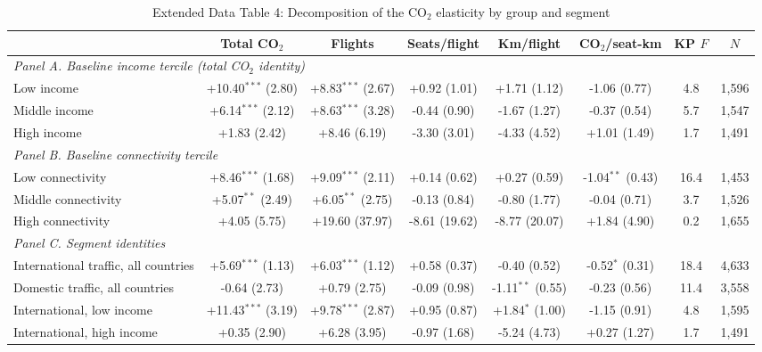 \documentclass[12pt]{article}
\begin{document}
\begin{table}[htbp]
\centering
\begin{threeparttable}
\caption{Extended Data Table 4: Decomposition of the CO$_2$ elasticity by group and segment}
\label{tab:decomp_hetero}
\scriptsize
\begin{tabular}{lccccccc}
\toprule
 & Total CO$_2$ & Flights & Seats/flight & Km/flight & CO$_2$/seat-km & KP $F$ & $N$ \\
\midrule
\multicolumn{8}{l}{\textit{Panel A. Baseline income tercile (total CO$_2$ identity)}} \\
  Low income & +10.40$^{***}$ (2.80) & +8.83$^{***}$ (2.67) & +0.92 (1.01) & +1.71 (1.12) & -1.06 (0.77) & 4.8 & 1,596 \\
  Middle income & +6.14$^{***}$ (2.12) & +8.63$^{***}$ (3.28) & -0.44 (0.90) & -1.67 (1.27) & -0.37 (0.54) & 5.7 & 1,547 \\
  High income & +1.83 (2.42) & +8.46 (6.19) & -3.30 (3.01) & -4.33 (4.52) & +1.01 (1.49) & 1.7 & 1,491 \\
\multicolumn{8}{l}{\textit{Panel B. Baseline connectivity tercile}} \\
  Low connectivity & +8.46$^{***}$ (1.68) & +9.09$^{***}$ (2.11) & +0.14 (0.62) & +0.27 (0.59) & -1.04$^{**}$ (0.43) & 16.4 & 1,453 \\
  Middle connectivity & +5.07$^{**}$ (2.49) & +6.05$^{**}$ (2.75) & -0.13 (0.84) & -0.80 (1.77) & -0.04 (0.71) & 3.7 & 1,526 \\
  High connectivity & +4.05 (5.75) & +19.60 (37.97) & -8.61 (19.62) & -8.77 (20.07) & +1.84 (4.90) & 0.2 & 1,655 \\
\multicolumn{8}{l}{\textit{Panel C. Segment identities}} \\
  International traffic, all countries & +5.69$^{***}$ (1.13) & +6.03$^{***}$ (1.12) & +0.58 (0.37) & -0.40 (0.52) & -0.52$^{*}$ (0.31) & 18.4 & 4,633 \\
  Domestic traffic, all countries & -0.64 (2.73) & +0.79 (2.75) & -0.09 (0.98) & -1.11$^{**}$ (0.55) & -0.23 (0.56) & 11.4 & 3,558 \\
  International, low income & +11.43$^{***}$ (3.19) & +9.78$^{***}$ (2.87) & +0.95 (0.87) & +1.84$^{*}$ (1.00) & -1.15 (0.91) & 4.8 & 1,595 \\
  International, high income & +0.35 (2.90) & +6.28 (3.95) & -0.97 (1.68) & -5.24 (4.73) & +0.27 (1.27) & 1.7 & 1,491 \\
\bottomrule
\end{tabular}
\begin{tablenotes}\scriptsize

\end{tablenotes}
\end{threeparttable}
\end{table}
\end{document}
